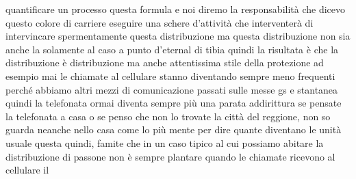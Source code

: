 {quantificare un processo questa formula e noi diremo la responsabilità che dicevo questo colore di carriere eseguire una schere d'attività che interventerà di intervincare spermentamente questa distribuzione ma questa distribuzione non sia anche la solamente al caso a punto d'eternal di tibia quindi la risultata è che la distribuzione è distribuzione ma anche attentissima stile della protezione ad esempio mai le chiamate al cellulare stanno diventando sempre meno frequenti perché abbiamo altri mezzi di comunicazione passati sulle messe gs e stantanea quindi la telefonata ormai diventa sempre più una parata addirittura se pensate la telefonata a casa o se penso che non lo trovate la città del reggione, non so guarda neanche nello casa come lo più mente per dire quante diventano le unità usuale questa quindi, famite che in un caso tipico al cui possiamo abitare la distribuzione di passone non è sempre plantare quando le chiamate ricevono al cellulare il 

}
